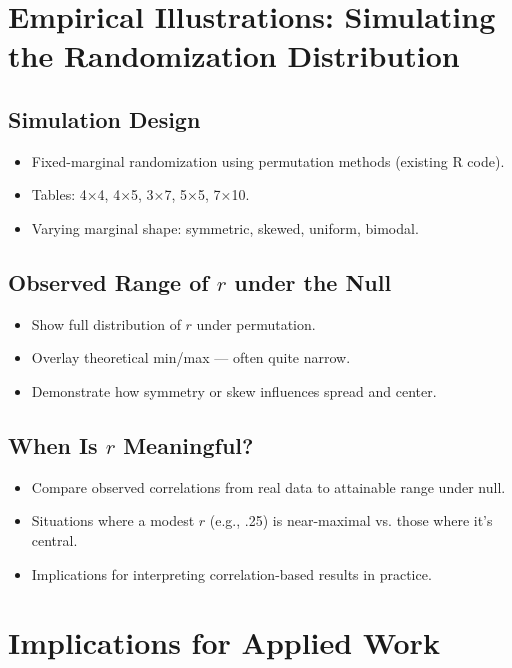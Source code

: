 \documentclass[12pt]{article}
\begin{document}
\section{Empirical Illustrations: Simulating the Randomization Distribution}

\subsection{Simulation Design}
\begin{itemize}
  \item Fixed-marginal randomization using permutation methods (existing R code).
  \item Tables: 4×4, 4×5, 3×7, 5×5, 7×10.
  \item Varying marginal shape: symmetric, skewed, uniform, bimodal.
\end{itemize}

\subsection{Observed Range of \( r \) under the Null}
\begin{itemize}
  \item Show full distribution of \( r \) under permutation.
  \item Overlay theoretical min/max — often quite narrow.
  \item Demonstrate how symmetry or skew influences spread and center.
\end{itemize}

\subsection{When Is \( r \) Meaningful?}
\begin{itemize}
  \item Compare observed correlations from real data to attainable range under null.
  \item Situations where a modest \( r \) (e.g., .25) is near-maximal vs. those where it’s central.
  \item Implications for interpreting correlation-based results in practice.
\end{itemize}

\section{Implications for Applied Work}
\end{document}
